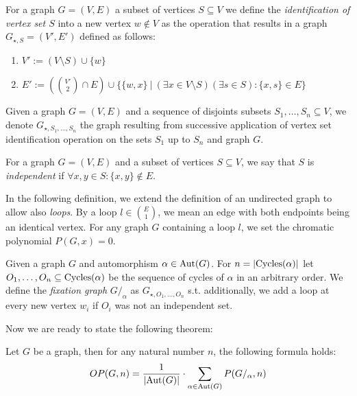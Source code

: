 \begin{defn}
    For a graph $G=(V,E)$ a subset of vertices $S \subseteq V$ we define the \emph{identification of vertex set $S$} into a new vertex $w \notin V$ as the operation that results in a graph $G_{\star,S}=(V',E')$ defined as follows:
    \begin{enumerate}
        \item $V' := (V \setminus S) \cup \{w\}$
        \item $E' := \left( \binom{V'}{2} \cap E\right) \cup \{ \{w,x\} \ | \ (\exists x \in V \setminus S)(\exists s \in S): \{x,s\} \in E\}$
    \end{enumerate}
\end{defn}

Given a graph $G=(V,E)$ and a sequence of disjoints subsets $S_1, \ldots , S_n \subseteq V$, we denote $G_{\star,S_1,\ldots,S_n}$ the graph resulting from successive application of vertex set identification operation on the sets $S_1$ up to $S_n$ and graph $G$.

\begin{defn}
    For a graph $G=(V,E)$ and a subset of vertices $S \subseteq V$, we say that $S$ is \emph{independent} if $\forall x,y \in S : \{x,y\} \notin E$.
\end{defn}

In the following definition, we extend the definition of an undirected graph to allow also \textit{loops}. By a loop $l \in \binom{E}{1}$, we mean an edge with both endpoints being an identical vertex. For any graph $G$ containing a loop $l$, we set the chromatic polynomial $P(G,x) = 0$.

\begin{defn}
    Given a graph $G$ and automorphism $\alpha \in \operatorname{Aut}(G)$. For $n = \left|{\operatorname{Cycles}(\alpha)}\right|$ let $O_1, \ldots ,O_n \subseteq \operatorname{Cycles}(\alpha)$ be the sequence of cycles of $\alpha$ in an arbitrary order. We define the \emph{fixation graph} $G /_{\alpha}$ as $G_{\star,O_1, \ldots , O_n}$ s.t. additionally, we add a loop at every new vertex $w_i$ if $O_i$ was not an independent set.
\end{defn}

Now we are ready to state the following theorem:

\begin{highlight}

\begin{thm} \label{thm:count-orb-chrompoly}
    Let $G$ be a graph, then for any natural number $n$, the following formula holds:
    \begin{equation} \label{eqn:oribtal-chrompoly}
        OP(G,n) = \frac{1}{\left|{\operatorname{Aut}(G)}\right|} \cdot \sum_{\alpha \in \operatorname{Aut}(G)}P(G/_\alpha,n)
    \end{equation}
\end{thm}

\end{highlight}

